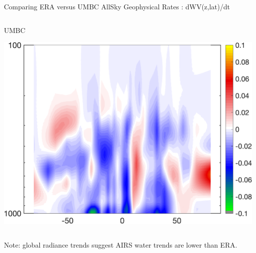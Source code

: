 \documentclass[10pt,t]{beamer}
\begin{document}
\begin{frame}{Comparing ERA versus UMBC AllSky Geophysical Rates : dWV(z,lat)/dt}
\begin{columns}
\begin{column}{0.55\columnwidth}
\begin{block}{\footnotesize UMBC}
\vspace{-0.1in}
\begin{center}
\includegraphics[width=\linewidth]{Figs/CloudAnom/Desc_ocean/wv_lat_p_rates_from_obs_specral_rates.png}
\end{center}
\end{block}
\end{column}
\end{columns}
Note: global radiance trends suggest AIRS water trends are lower than ERA.

\end{frame}
\end{document}
